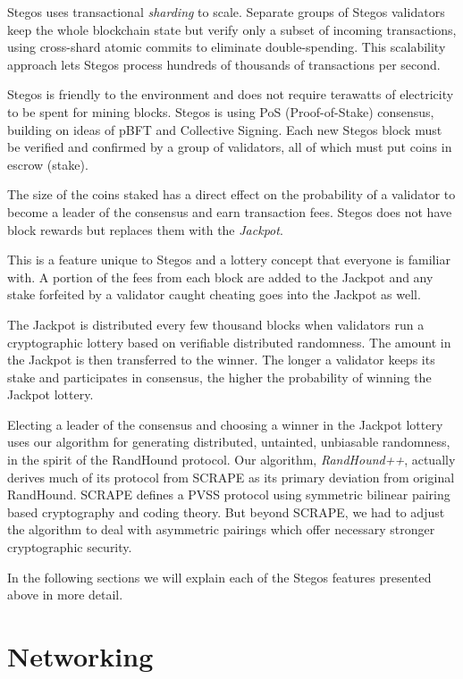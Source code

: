 \documentclass[a4paper, 10pt, conference]{ieeeconf}
\begin{document}
Stegos uses transactional \textit{sharding} to scale. Separate gro\-ups of Stegos validators keep the whole blockchain state but verify only a subset of incoming transactions, using cross-shard atomic commits to eliminate double-spending. This scalability approach lets Stegos process hundreds of thousands of transactions per second.

Stegos is friendly to the environment and does not require terawatts of electricity to be spent for mining blocks. Stegos is using PoS (Proof-of-Stake) consensus, building on ideas of pBFT\cite{c9} and Collective Signing\cite{c10}\cite{c11}. Each new Stegos block must be verified and confirmed by a group of validators, all of which must put coins in escrow (stake).

The size of the coins staked has a direct effect on the probability of a validator to become a leader of the consensus and earn transaction fees. Stegos does not have block rewards but replaces them with the \textit{Jackpot}.

This is a feature unique to Stegos and a lottery concept that everyone is familiar with. A portion of the fees from each block are added to the Jackpot and any stake forfeited by a validator caught cheating goes into the Jackpot as well.

The Jackpot is distributed every few thousand blocks when validators run a cryptographic lottery based on verifiable distributed randomness. The amount in the Jackpot is then transferred to the winner. The longer a validator keeps its stake and participates in consensus, the higher the probability of winning the Jackpot lottery.

Electing a leader of the consensus and choosing a winner in the Jackpot lottery uses our algorithm for generating distributed, untainted, unbiasable randomness, in the spirit of the RandHound protocol\cite{c12}. Our algorithm, \textit{RandHound++}, actually derives much of its protocol from SCRAPE\cite{c13} as its primary deviation from original RandHound. SCRAPE defines a PVSS\cite{c14} protocol using symmetric bilinear pairing based cryptography and coding theory. But beyond SCRAPE, we had to adjust the algorithm to deal with asymmetric pairings which offer necessary stronger cryptographic security.

In the following sections we will explain each of the Stegos features presented above in more detail.

\section{Networking}\label{networking}
\end{document}
